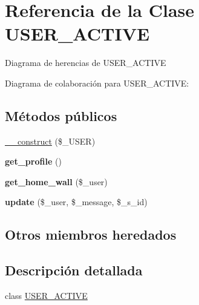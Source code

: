 \hypertarget{class_u_s_e_r___a_c_t_i_v_e}{\section{Referencia de la Clase U\-S\-E\-R\-\_\-\-A\-C\-T\-I\-V\-E}
\label{class_u_s_e_r___a_c_t_i_v_e}
}


Diagrama de herencias de U\-S\-E\-R\-\_\-\-A\-C\-T\-I\-V\-E


Diagrama de colaboración para U\-S\-E\-R\-\_\-\-A\-C\-T\-I\-V\-E\-:
\subsection*{Métodos públicos}
\begin{DoxyCompactItemize}
\item 
\hyperlink{class_u_s_e_r___a_c_t_i_v_e_a15892f146e6b2027d102f45066962756}{\-\_\-\-\_\-construct} (\$\-\_\-\-U\-S\-E\-R)
\item 
\hypertarget{class_u_s_e_r___a_c_t_i_v_e_ad7944ef57718a0a15ae22d2f873c50bf}{{\bfseries get\-\_\-profile} ()}\label{class_u_s_e_r___a_c_t_i_v_e_ad7944ef57718a0a15ae22d2f873c50bf}

\item 
\hypertarget{class_u_s_e_r___a_c_t_i_v_e_a9cc22133ec32d2129c370ac1d7d47e01}{{\bfseries get\-\_\-home\-\_\-wall} (\$\-\_\-user)}\label{class_u_s_e_r___a_c_t_i_v_e_a9cc22133ec32d2129c370ac1d7d47e01}

\item 
\hypertarget{class_u_s_e_r___a_c_t_i_v_e_a43ecbcd08f1d2ccbf20bff9f87c6fb1d}{{\bfseries update} (\$\-\_\-user, \$\-\_\-message, \$\-\_\-s\-\_\-id)}\label{class_u_s_e_r___a_c_t_i_v_e_a43ecbcd08f1d2ccbf20bff9f87c6fb1d}

\end{DoxyCompactItemize}
\subsection*{Otros miembros heredados}


\subsection{Descripción detallada}
class \hyperlink{class_u_s_e_r___a_c_t_i_v_e}{U\-S\-E\-R\-\_\-\-A\-C\-T\-I\-V\-E} 

